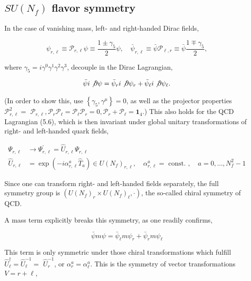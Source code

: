 \documentclass[10pt, letterpaper]{article}
\begin{document}
\subsection{$SU(N_f)$ flavor symmetry}

In the case of vanishing mass, left- and right-handed Dirac fields,

$$
\psi_{r, \ell} \equiv \mathcal{P}_{r, \ell} \psi \equiv \frac{1 \pm \gamma_{5}}{2} \psi, \quad \bar{\psi}_{r, \ell} \equiv \bar{\psi} \mathcal{P}_{\ell, r} \equiv \bar{\psi} \frac{1 \mp \gamma_{5}}{2},
$$

where $\gamma_{5}=i \gamma^{0} \gamma^{1} \gamma^{2} \gamma^{3}$, decouple in the Dirac Lagrangian,

$$
\bar{\psi} i \not \partial \psi=\bar{\psi}_{r} i \not \partial \psi_{r}+\bar{\psi}_{\ell} i \not \partial \psi_{\ell} .
$$

(In order to show this, use $\left\{\gamma_{5}, \gamma^{\mu}\right\}=0$, as well as the projector properties $\mathcal{P}_{r, \ell}^{2}=$ $\mathcal{P}_{r, \ell}, \mathcal{P}_{r} \mathcal{P}_{\ell}=\mathcal{P}_{\ell} \mathcal{P}_{r}=0, \mathcal{P}_{r}+\mathcal{P}_{\ell}=\mathbf{1}_{4}$.) This also holds for the QCD Lagrangian (5.6), which is then invariant under global unitary transformations of right- and left-handed quark fields,

$$
\begin{aligned}
\Psi_{r, \ell} & \longrightarrow \Psi_{r, \ell}^{\prime}=\hat{U}_{r, \ell} \Psi_{r, \ell} \\
\hat{U}_{r, \ell} & =\exp \left(-i \alpha_{r, \ell}^{a} \hat{T}_{a}\right) \in U\left(N_{f}\right)_{r, \ell}, \quad \alpha_{r, \ell}^{a}=\text { const. }, \quad a=0, \ldots, N_{f}^{2}-1
\end{aligned}
$$

Since one can transform right- and left-handed fields separately, the full symmetry group is $\left(U\left(N_{f}\right)_{r} \times U\left(N_{f}\right)_{\ell}, \cdot\right)$, the so-called chiral symmetry of QCD.

A mass term explicitly breaks this symmetry, as one readily confirms,

$$
\bar{\psi} m \psi=\bar{\psi}_{\ell} m \psi_{r}+\bar{\psi}_{r} m \psi_{\ell}
$$

This term is only symmetric under those chiral transformations which fulfill $\hat{U}_{\ell}^{\dagger}=\hat{U}_{\ell}^{-1}=$ $\hat{U}_{r}^{-1}$, or $\alpha_{r}^{a}=\alpha_{\ell}^{a}$. This is the symmetry of vector transformations $V=r+\ell$,
\end{document}
